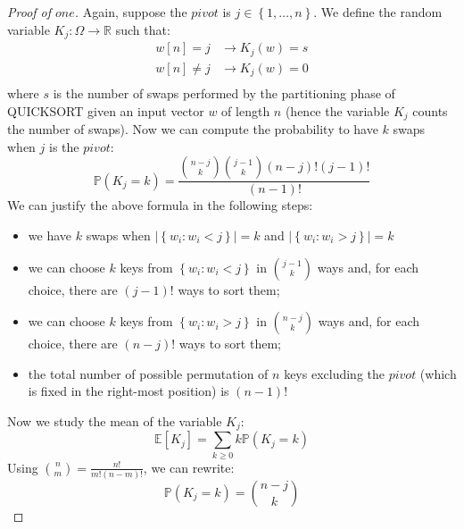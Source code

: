 \begin{proof}[Proof of $one$]
  Again, suppose the $pivot$ is $j \in \left \lbrace
    1,\ldots,n \right\rbrace $. We define the random variable $K_j:
  \Omega \rightarrow \mathbb{R}$ such that:
  \begin{displaymath}
    \begin{split}
      w[n] = j &\rightarrow K_j(w) = s \\
      w[n] \not= j &\rightarrow K_j(w) = 0 \\
    \end{split}
  \end{displaymath}
  where $s$ is the number of swaps performed by the partitioning phase
  of QUICKSORT given an input vector $w$ of length $n$ (hence the
  variable $K_j$ counts the number of swaps). Now we can compute the
  probability to have $k$ swaps when $j$ is the $pivot$:
  \begin{displaymath}
    \mathbb{P}\left(K_j = k \right) =  \frac{{{n-j}\choose{k}}
      {{j-1}\choose{k}} (n-j)! (j-1)! }{(n-1)!}
  \end{displaymath}
  We can justify the above formula in the following steps:
  \begin{itemize}
  \item we have $k$ swaps when $\left| \left \lbrace
        w_i : w_i < j \right\rbrace \right| = k$ and
    $\left| \left \lbrace
        w_i : w_i > j \right\rbrace \right| = k$
  \item we can choose $k$ keys from $\left \lbrace w_i : w_i < j
    \right\rbrace$ in ${{j-1}\choose{k}}$ ways and, for each choice,
    there are $(j-1)!$ ways to sort them;
  \item we can choose $k$ keys from $\left \lbrace w_i : w_i > j
    \right\rbrace$ in ${{n-j}\choose{k}}$ ways and, for each choice,
    there are $(n-j)!$ ways to sort them;
  \item the total number of possible permutation of $n$ keys excluding
    the $pivot$ (which is fixed in the right-most position) is
    $(n-1)!$
  \end{itemize}
  Now we study the mean of the variable $K_j$:
  \begin{displaymath}
    \mathbb{E} \left[ K_j \right] = \sum_{k \geq 0}{k \mathbb{P}\left(
        K_j = k      \right) }
  \end{displaymath}
  Using ${{n}\choose{m}} =  \frac{n!}{m!(n-m)!} $, we can rewrite:
  \begin{displaymath}
    \mathbb{P}\left(K_j = k \right) =  {{n-j}\choose{k}}

\end{displaymath}
\end{proof}
